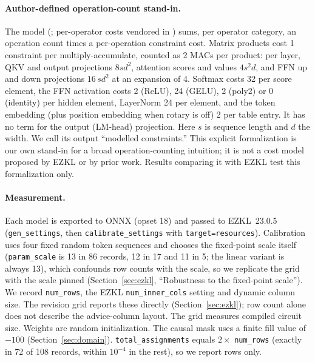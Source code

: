 \documentclass[10pt]{article}
\begin{document}
\paragraph{Author-defined operation-count stand-in.}
The model (; per-operator costs vendored
in ) sums, per operator category, an operation count
times a per-operation constraint cost. Matrix products cost 1 constraint per
multiply-accumulate, counted as 2 MACs per product: per layer, QKV and output
projections $8sd^2$, attention scores and values $4s^2d$, and FFN up and down
projections $16\,sd^2$ at an expansion of 4. Softmax costs 32 per score
element, the FFN activation costs 2 (ReLU), 24 (GELU), 2 (poly2) or 0
(identity) per hidden element, LayerNorm 24 per element, and the token embedding
(plus position embedding when rotary is off) 2 per table entry. It has no term
for the output (LM-head) projection. Here $s$ is sequence length and $d$ the
width. We call its output ``modelled constraints.'' This explicit formalization
is our own stand-in for a broad operation-counting intuition; it is not a cost
model proposed by EZKL or by prior work. Results comparing it with EZKL test
this formalization only.

\paragraph{Measurement.}
Each model is exported to ONNX (opset 18) and passed to EZKL~23.0.5
(\texttt{gen\_settings}, then \texttt{calibrate\_settings} with
\texttt{target=resources}). Calibration uses four fixed random token sequences
and chooses the fixed-point scale itself (\texttt{param\_scale} is 13 in 86
records, 12 in 17 and 11 in 5; the linear variant is always 13), which
confounds row counts with the scale, so we replicate the grid with the scale
pinned (Section~\ref{sec:ezkl}, ``Robustness to the fixed-point scale''). We record \texttt{num\_rows}, the EZKL \texttt{num\_inner\_cols} setting and dynamic column size. The revision grid reports these directly (Section~\ref{sec:ezkl}); row count alone does not describe the advice-column layout. The grid measures compiled circuit size. Weights are random initialization. The causal mask uses a finite fill value of
$-100$ (Section~\ref{sec:domain}). \texttt{total\_assignments} equals $2\times$
\texttt{num\_rows} (exactly in 72 of 108 records, within $10^{-4}$ in the rest), so
we report rows only.

\end{document}
